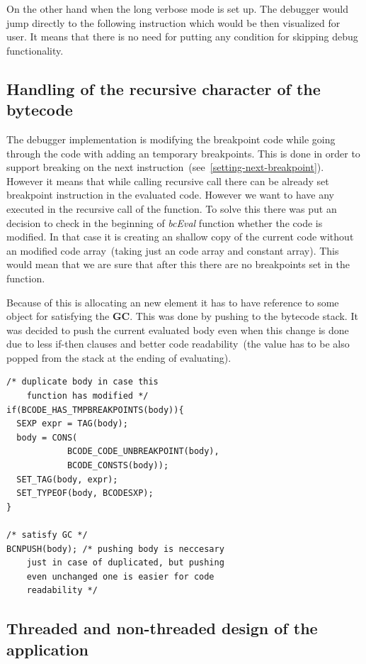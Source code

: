 \documentclass[thesis=M,english]{FITthesis}[2018/10/20]
\begin{document}
On the other hand when the long verbose mode is set up. The debugger would jump directly to the following instruction which would be then visualized for user. It means that there is no need for putting any condition for skipping debug functionality.

\subsection{Handling of the recursive character of the bytecode}

The debugger implementation is modifying the breakpoint code  while going through the code with adding an temporary breakpoints. This is done in order to support breaking on the next instruction~(see~\ref{setting-next-breakpoint}). However it means that while calling recursive call there can be already set breakpoint instruction in the evaluated code. However we want to have any executed in the recursive call of the function. To solve this there was put an decision to check in the beginning of \textit{bcEval} function whether the code is modified. In that case it is creating an shallow copy of the current code without an modified code array~(taking just an code array and constant array). This would mean that we are sure that after this there are no breakpoints set in the function.

Because of this is allocating an new element it has to have reference to some object for satisfying the \textbf{GC}. This was done by pushing to the bytecode stack. It was decided to push the current evaluated body even when this change is done due to less if-then clauses and better code readability~(the value has to be also popped from the stack at the ending of evaluating).

\begin{lstlisting}
/* duplicate body in case this 
	function has modified */
if(BCODE_HAS_TMPBREAKPOINTS(body)){
  SEXP expr = TAG(body);
  body = CONS(
            BCODE_CODE_UNBREAKPOINT(body), 
            BCODE_CONSTS(body));
  SET_TAG(body, expr);
  SET_TYPEOF(body, BCODESXP);
}

/* satisfy GC */
BCNPUSH(body); /* pushing body is neccesary 
	just in case of duplicated, but pushing 
	even unchanged one is easier for code
    readability */

\end{lstlisting}

\subsection{Threaded and non-threaded design of the application}
\end{document}
